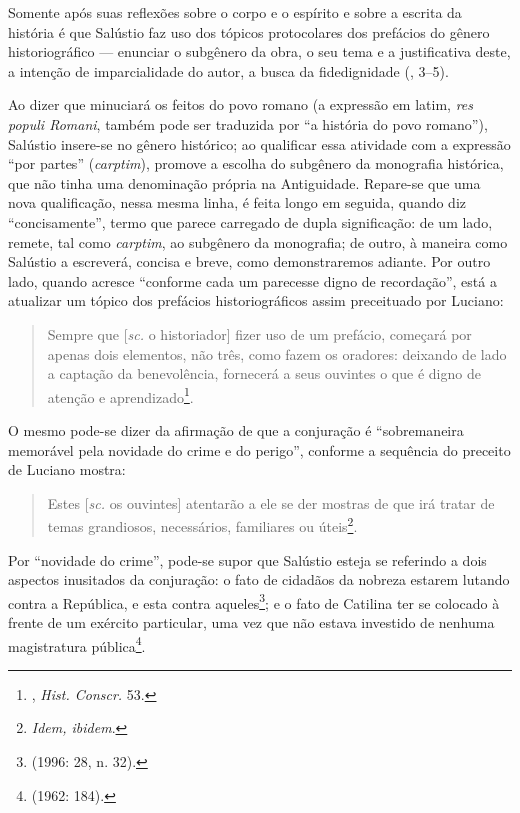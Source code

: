Somente após suas reflexões sobre o corpo  e o espírito e sobre a escrita da
história é que Salústio faz uso dos tópicos protocolares dos prefácios do
gênero historiográfico --- enunciar o subgênero da obra, o seu tema e a
justificativa deste, a intenção de imparcialidade do autor, a busca da
fidedignidade (, 3--5).

Ao dizer que minuciará os feitos do povo romano (a expressão em latim,
\emph{res populi Romani}, também pode ser traduzida por “a história do povo
romano”), Salústio insere-se no gênero histórico; ao qualificar essa atividade
com a expressão “por partes” (\emph{carptim}), promove a escolha do subgênero
da monografia histórica, que não tinha uma denominação própria na Antiguidade.
Repare-se que uma nova qualificação, nessa mesma linha, é feita longo em
seguida, quando diz “concisamente”, termo que parece carregado de dupla
significação: de um lado, remete, tal como \emph{carptim}, ao subgênero da
monografia; de outro, à maneira como Salústio a escreverá, concisa e breve,
como demonstraremos adiante. Por outro lado, quando acresce “conforme cada um
parecesse digno de recordação”, está a atualizar um tópico dos prefácios
historiográficos assim preceituado por Luciano:


\begin{quote} Sempre que [\emph{sc.} o historiador] fizer uso de um prefácio,
  começará por apenas dois elementos, não três, como fazem os oradores:
  deixando de lado a captação da benevolência, fornecerá a seus ouvintes o que
  é digno de atenção e aprendizado\footnote{ , \emph{Hist. Conscr.} 53.}. 

\end{quote}

O mesmo pode-se dizer da afirmação de que a conjuração é “sobremaneira
memorável pela novidade do crime e do perigo”, conforme a sequência do preceito
de Luciano mostra:

\begin{quote}

Estes [\emph{sc.} os ouvintes] atentarão a ele se der mostras de que irá tratar
de temas grandiosos, necessários, familiares ou úteis\footnote{\emph{Idem,
ibidem}.}.

\end{quote}

 
Por “novidade do crime”, pode-se supor que Salústio esteja se referindo a dois
aspectos inusitados da conjuração: o fato de cidadãos da nobreza estarem
lutando contra a República, e esta contra aqueles\footnote{ (1996:
28, n. 32).}; e o fato de Catilina ter se colocado à frente de um exército
particular, uma vez que não estava investido de nenhuma magistratura
pública\footnote{  (1962: 184).}.

